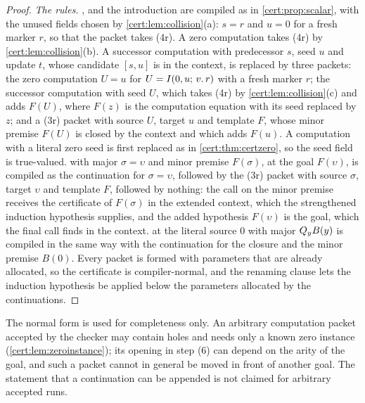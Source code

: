 \begin{proof}
\emph{The rules.} ,  and the introduction are
compiled as in \cref{cert:prop:scalar}, with the unused fields chosen by
\cref{cert:lem:collision}(a): $s=r$ and $u=0$ for a fresh marker $r$, so that
the packet takes (4r). A zero computation takes (4r) by
\cref{cert:lem:collision}(b). A successor computation with predecessor $s$,
seed $u$ and update $t$, whose candidate $[s,u]$ is in the context, is
replaced by three packets: the zero computation $U=u$ for
$U=I(0,u;\,v.\,r)$ with a fresh marker $r$; the successor computation with
seed $U$, which takes (4r) by \cref{cert:lem:collision}(c) and adds $F(U)$,
where $F(z)$ is the computation equation with its seed replaced by $z$; and a
(3r) packet with source $U$, target $u$ and template $F$, whose minor premise
$F(U)$ is closed by the context and which adds $F(u)$. A computation with a
literal zero seed is first replaced as in \cref{cert:thm:certzero}, so the
seed field is true-valued.  with major $\sigma=\upsilon$ and minor
premise $F(\sigma)$, at the goal $F(\upsilon)$, is compiled as the
continuation for $\sigma=\upsilon$, followed by the (3r) packet with source
$\sigma$, target $\upsilon$ and template $F$, followed by nothing: the call on
the minor premise receives the certificate of $F(\sigma)$ in the extended
context, which the strengthened induction hypothesis supplies, and the added
hypothesis $F(\upsilon)$ is the goal, which the final call finds in the
context.  at the literal source $0$ with major $Q_{y}B(y)$ is
compiled in the same way with the continuation for the closure and the
minor premise $B(0)$. Every packet is formed with parameters that are already
allocated, so the certificate is compiler-normal, and the renaming clause
lets the induction hypothesis be applied below the parameters allocated by
the continuations.
\end{proof}

The normal form is used for completeness only. An arbitrary computation
packet accepted by the checker may contain holes and needs only a known zero
instance (\cref{cert:lem:zeroinstance}); its opening in step (6) can depend on
the arity of the goal, and such a packet cannot in general be moved in front
of another goal. The statement that a continuation can be appended is not
claimed for arbitrary accepted runs.

